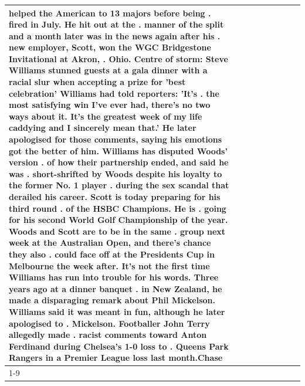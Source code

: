 \begin{table}[H]
\begin{tabular}{lllrlllll}
helped the American to 13 majors before being . fired in July. He hit out at the . manner of the split and a month later was in the news again after his . new employer, Scott, won the WGC Bridgestone Invitational at Akron, . Ohio. Centre of storm: Steve Williams stunned guests at a gala dinner with a racial slur when accepting a prize for 'best celebration' Williams had told reporters: 'It's . the most satisfying win I've ever had, there's no two ways about it. It's the greatest week of my life caddying and I sincerely mean that.' He later apologised for those comments, saying his emotions got the better of him. Williams has disputed Woods' version . of how their partnership ended, and said he was . short-shrifted by Woods despite his loyalty to the former No. 1 player . during the sex scandal that derailed his career. Scott is today preparing for his third round . of the HSBC Champions. He is . going for his second World Golf Championship of the year. Woods and Scott are to be in the same . group next week at the Australian Open, and there's chance they also . could face off at the Presidents Cup in Melbourne the week after. It's not the first time Williams has run into trouble for his words. Three years ago at a dinner banquet . in New Zealand, he made a disparaging remark about Phil Mickelson. Williams said it was meant in fun, although he later apologised to . Mickelson. Footballer John Terry allegedly made . racist comments toward Anton Ferdinand during Chelsea's 1-0 loss to . Queens Park Rangers in a Premier League loss last month.Chase \\
\cline{1-9}

\end{tabular}
\end{table}
